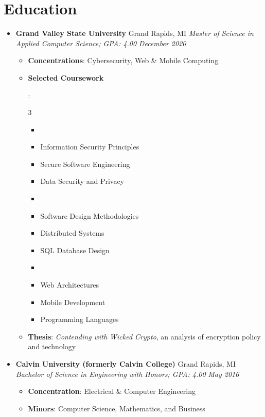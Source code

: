 \documentclass[letterpaper,11pt]{article}
\newcommand{\resumeItem}[2]{
  \item\small{
    \textbf{#1}{: #2 \vspace{-2pt}}
  }
}
\newcommand{\resumeSubheading}[4]{
  \vspace{-1pt}\item
    \textbf{#1} \dotfill #2 \newline
    \textit{\small#3} \hfill \textit{\small #4}
  \vspace{-5pt}
}
\newcommand{\resumeSubHeadingListStart}{\begin{itemize}[leftmargin=*]}
\newcommand{\resumeSubHeadingListEnd}{\end{itemize}}
\newcommand{\resumeItemListStart}{\begin{itemize}}
\newcommand{\resumeItemListEnd}{\end{itemize}\vspace{-5pt}}
\newcommand{\resumeListMulticolStart}[1]{
  \vspace{-2.4em}
  \setlength{\columnsep}{-1pc}
  \begin{multicols}{#1}
    \begin{itemize}[label={}]
      \item
}
\newcommand{\resumeListMulticolEnd}{
    \end{itemize}
  \end{multicols}
  \vspace{-10pt}
}
\begin{document}
  \section{Education}
    \resumeSubHeadingListStart
      \resumeSubheading
        {Grand Valley State University}{Grand Rapids, MI}
        {Master of Science in Applied Computer Science; GPA: 4.00}{December 2020}
        \resumeItemListStart
          \resumeItem{Concentrations}
            {Cybersecurity, Web \& Mobile Computing}
          \resumeItem{Selected Coursework}
            {
              \resumeListMulticolStart{3}
                \item Information Security Principles
                \item Secure Software Engineering
                \item Data Security and Privacy
                \item %
                \item Software Design Methodologies
                \item Distributed Systems
                \item SQL Database Design
                \item %
                \item Web Architectures
                \item Mobile Development
                \item Programming Languages
              \resumeListMulticolEnd
            }
          \resumeItem{Thesis}
            {\textit{Contending with Wicked Crypto}, an analysis of encryption policy and technology}
        \resumeItemListEnd
      \resumeSubheading
        {Calvin University (formerly Calvin College)}{Grand Rapids, MI}
        {Bachelor of Science in Engineering with Honors; GPA: 4.00}{May 2016}
        \resumeItemListStart
          \resumeItem{Concentration}
            {Electrical \& Computer Engineering}
          \resumeItem{Minors}
            {Computer Science, Mathematics, and Business}
        \resumeItemListEnd
    \resumeSubHeadingListEnd
\end{document}
